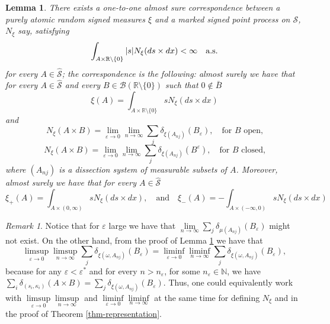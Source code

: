 \documentclass{article}
\theoremstyle{plain}
\newtheorem{lemma}[theorem]{Lemma}
\theoremstyle{remark}
\newtheorem{remark}[theorem]{Remark}
\begin{document}
\begin{lemma}\label{lem-correspondence}
	There exists a one-to-one almost sure correspondence between a purely atomic random signed measures $\xi$ and a marked signed point process on $\mathcal{S}$, $N_\xi$ say, satisfying
	\begin{equation}\label{eq-0}
		\int_{A\times \mathbb{R}\setminus\{0\}} |s|N_{\xi}(ds\times dx)<\infty\quad\textnormal{a.s.}
	\end{equation}
	for every $A\in\hat{\mathcal{S}}$; the correspondence is the following: almost surely we have that for every $A\in\hat{\mathcal{S}}$ and every $B\in \mathcal{B} (\mathbb{R}\setminus\{0\})$ such that $0\notin\bar{B}$
	\begin{equation}\label{eq-1}
		\xi(A)=	\int_{A\times \mathbb{R}\setminus\{0\}} sN_{\xi}(ds\times dx)
	\end{equation}
	and
	\begin{equation}\label{eq-2}
		N_{\xi}(A\times B)=\lim\limits_{\varepsilon\to 0}\lim\limits_{n\to\infty}\sum_{j}\delta_{\xi(A_{nj})}(B_{\varepsilon}),\quad\text{for $B$ open,}
	\end{equation}
	\begin{equation}
		N_{\xi}(A\times B)=\lim\limits_{\varepsilon\to 0}\lim\limits_{n\to\infty}\sum_{j}\delta_{\xi(A_{nj})}(B^{\varepsilon}),\quad\text{for $B$ closed,}
	\end{equation}
	where $(A_{nj})$ is a dissection system of measurable subsets of $A$. Moreover,  almost surely we have that for every $A\in\hat{\mathcal{S}}$ 
	\begin{equation*}
		\xi_+(A)=	\int_{A\times (0,\infty)} sN_{\xi}(ds\times dx),\quad\text{and}\quad 	\xi_-(A)=	-\int_{A\times (-\infty,0)} sN_{\xi}(ds\times dx)
	\end{equation*}
\end{lemma}

\begin{remark}
	Notice that for $\varepsilon$ large we have that $\lim\limits_{n\to\infty}\sum_{j}\delta_{\mu(A_{nj})}(B_{\varepsilon})$ might not exist. On the other hand, from the proof of Lemma \ref{lem-correspondence} we have that 
	\begin{equation*}
		\limsup\limits_{\varepsilon\to 0}\limsup\limits_{n\to\infty}\sum_{j}\delta_{\xi(\omega,A_{nj})}(B_{\varepsilon})=\liminf\limits_{\varepsilon\to 0}\liminf\limits_{n\to\infty}\sum_{j}\delta_{\xi(\omega,A_{nj})}(B_{\varepsilon}),
	\end{equation*}
	because for any $\varepsilon<\varepsilon^*$ and for every $n>n_\varepsilon$, for some $n_\varepsilon\in\mathbb{N}$, we have $\sum_{i}\delta_{(s_i,\kappa_i)}(A\times B)=\sum_{j}\delta_{\xi(\omega,A_{nj})}(B_{\varepsilon})$. Thus, one could equivalently work with $\limsup\limits_{\varepsilon\to 0}\limsup\limits_{n\to\infty}$ and $\liminf\limits_{\varepsilon\to 0}\liminf\limits_{n\to\infty}$ at the same time for defining $N_{\xi}$ and in the proof of Theorem \ref{thm-representation}.
\end{remark}
\end{document}
